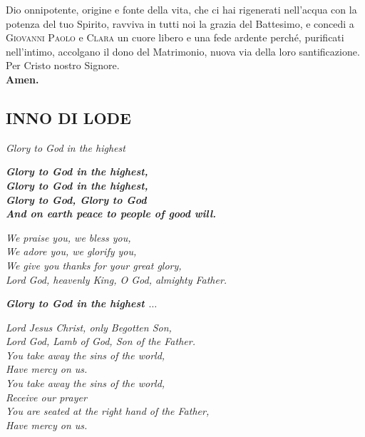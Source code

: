 \documentclass[10pt,b6paper,usenames,twoside]{article}
\begin{document}
\noindent Dio onnipotente, origine e fonte della vita, che ci hai rigenerati nell'acqua con la potenza del tuo Spirito, ravviva in tutti noi la grazia del Battesimo, e concedi a \textcolor{forestgreen(traditional)}{\textsc{Giovanni Paolo}} e \textcolor{forestgreen(traditional)}{\textsc{Clara}} un cuore libero e una fede ardente perché, purificati nell'intimo, accolgano il dono del Matrimonio, nuova via della loro santificazione. Per Cristo nostro Signore.\\ \textbf{Amen.} 

\subsection*{\textcolor{forestgreen(traditional)}{INNO DI LODE}}

\noindent \textcolor{forestgreen(traditional)}{\Acht}\hspace*{0mm} \textit{Glory to God in the highest}
\\ 


\hfill\begin{minipage}{\dimexpr\textwidth-1cm}
\textbf{\textit{Glory to God in the highest,\\
Glory to God in the highest,\\
Glory to God, Glory to God\\
And on earth peace to people of good will.}}\\
\end{minipage}

\noindent \textit{We praise you, we bless you,\\
We adore you, we glorify you,\\
We give you thanks for your great glory,\\
Lord God, heavenly King, O God, almighty Father.}\\

\hfill\begin{minipage}{\dimexpr\textwidth-1cm}
\textbf{\textit{Glory to God in the highest $\hdots$}}\\
\end{minipage}

\noindent \textit{Lord Jesus Christ, only Begotten Son,\\
Lord God, Lamb of God, Son of the Father.\\
You take away the sins of the world,\\
Have mercy on us.\\
You take away the sins of the world,\\ 
Receive our prayer\\
You are seated at the right hand of the Father,\\
Have mercy on us.}\\
\end{document}
